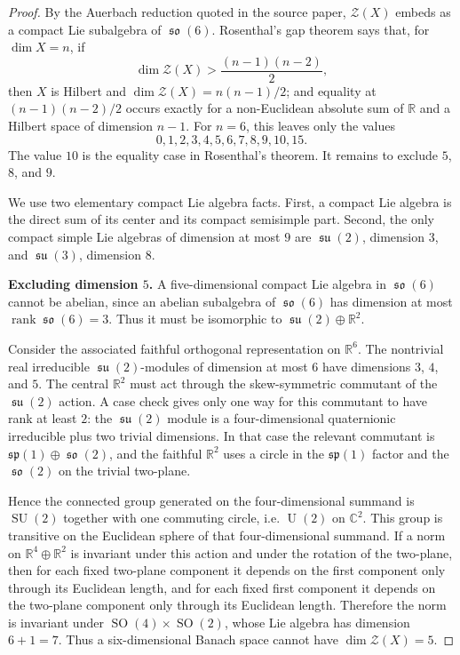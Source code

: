 \documentclass[11pt]{article}
\DeclareMathOperator{\SO}{SO}
\DeclareMathOperator{\SU}{SU}
\DeclareMathOperator{\U}{U}
\DeclareMathOperator{\so}{\mathfrak{so}}
\DeclareMathOperator{\su}{\mathfrak{su}}
\DeclareMathOperator{\rank}{rank}
\begin{document}
\begin{proof}
By the Auerbach reduction quoted in the source paper, $\mathcal Z(X)$ embeds
as a compact Lie subalgebra of $\so(6)$. Rosenthal's gap theorem says that,
for $\dim X=n$, if
\[
\dim \mathcal Z(X)>\frac{(n-1)(n-2)}{2},
\]
then $X$ is Hilbert and $\dim\mathcal Z(X)=n(n-1)/2$; and equality at
$(n-1)(n-2)/2$ occurs exactly for a non-Euclidean absolute sum of
$\mathbb R$ and a Hilbert space of dimension $n-1$. For $n=6$, this leaves
only the values
\[
0,1,2,3,4,5,6,7,8,9,10,15.
\]
The value $10$ is the equality case in Rosenthal's theorem. It remains to
exclude $5$, $8$, and $9$.

We use two elementary compact Lie algebra facts. First, a compact Lie algebra
is the direct sum of its center and its compact semisimple part. Second, the
only compact simple Lie algebras of dimension at most $9$ are $\su(2)$,
dimension $3$, and $\su(3)$, dimension $8$.

\smallskip
\noindent\textbf{Excluding dimension $5$.}
A five-dimensional compact Lie algebra in $\so(6)$ cannot be abelian, since
an abelian subalgebra of $\so(6)$ has dimension at most $\rank \so(6)=3$.
Thus it must be isomorphic to $\su(2)\oplus\mathbb R^2$.

Consider the associated faithful orthogonal representation on $\mathbb R^6$.
The nontrivial real irreducible $\su(2)$-modules of dimension at most $6$
have dimensions $3$, $4$, and $5$. The central $\mathbb R^2$ must act through
the skew-symmetric commutant of the $\su(2)$ action. A case check gives only
one way for this commutant to have rank at least $2$: the $\su(2)$ module is
a four-dimensional quaternionic irreducible plus two trivial dimensions.
In that case the relevant commutant is $\mathfrak{sp}(1)\oplus\so(2)$, and
the faithful $\mathbb R^2$ uses a circle in the $\mathfrak{sp}(1)$ factor
and the $\so(2)$ on the trivial two-plane.

Hence the connected group generated on the four-dimensional summand is
$\SU(2)$ together with one commuting circle, i.e. $\U(2)$ on $\mathbb C^2$.
This group is transitive on the Euclidean sphere of that four-dimensional
summand. If a norm on $\mathbb R^4\oplus\mathbb R^2$ is invariant under this
action and under the rotation of the two-plane, then for each fixed two-plane
component it depends on the first component only through its Euclidean length,
and for each fixed first component it depends on the two-plane component only
through its Euclidean length. Therefore the norm is invariant under
$\SO(4)\times\SO(2)$, whose Lie algebra has dimension $6+1=7$. Thus a
six-dimensional Banach space cannot have $\dim\mathcal Z(X)=5$.


\end{proof}
\end{document}
